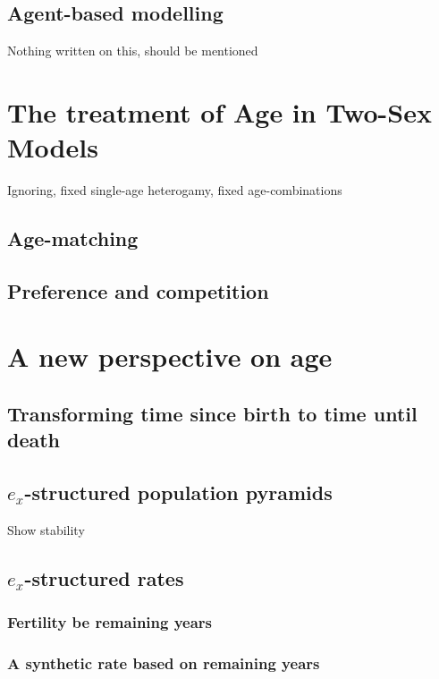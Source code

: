   \section{Agent-based modelling}
     Nothing written on this, should be mentioned
   
\chapter{The treatment of Age in Two-Sex Models}
  Ignoring, fixed single-age heterogamy, fixed age-combinations
  \section{Age-matching}
  
  \section{Preference and competition}
  
\chapter{A new perspective on age}

  \section{Transforming time since birth to time until death}
  
  \section{$e_x$-structured population pyramids}
    Show stability
  
  \section{$e_x$-structured rates}
    
    \subsection{Fertility be remaining years}
      
    
    \subsection{A synthetic rate based on remaining years}
    
